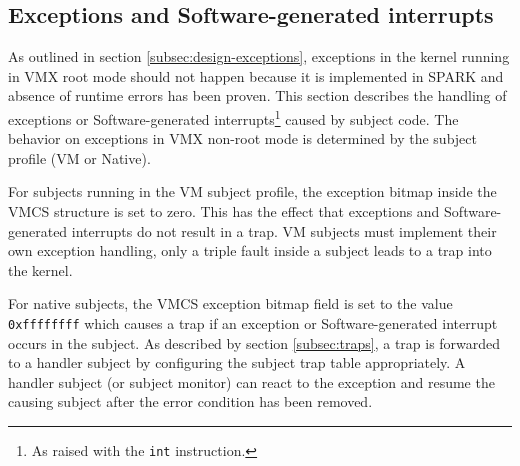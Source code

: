 \subsection{Exceptions and Software-generated interrupts}
As outlined in section \ref{subsec:design-exceptions}, exceptions in the kernel
running in VMX root mode should not happen because it is implemented in SPARK
and absence of runtime errors has been proven.  This section describes the
handling of exceptions or Software-generated interrupts\footnote{As raised with
the \texttt{int} instruction.} caused by subject code. The behavior on
exceptions in VMX non-root mode is determined by the subject profile (VM or
Native).

For subjects running in the VM subject profile, the exception bitmap inside the
VMCS structure is set to zero. This has the effect that exceptions and
Software-generated interrupts do not result in a trap. VM subjects must
implement their own exception handling, only a triple fault inside a subject
leads to a trap into the kernel.

For native subjects, the VMCS exception bitmap field is set to the value
\texttt{0xffffffff} which causes a trap if an exception or Software-generated
interrupt occurs in the subject. As described by section \ref{subsec:traps}, a
trap is forwarded to a handler subject by configuring the subject trap table
appropriately. A handler subject (or subject monitor) can react to the exception
and resume the causing subject after the error condition has been removed.
